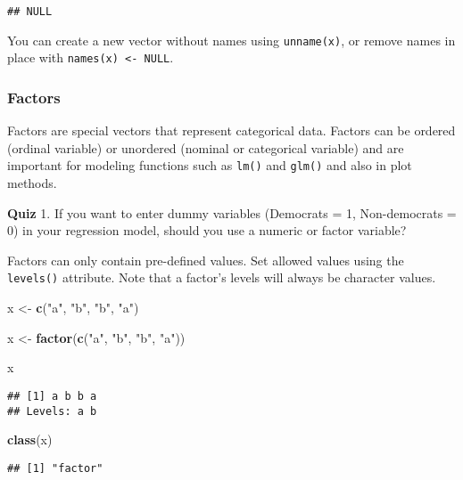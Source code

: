 \documentclass[
]{book}
\newenvironment{Shaded}{\begin{snugshade}}{\end{snugshade}}
\newcommand{\KeywordTok}[1]{\textcolor[rgb]{0.13,0.29,0.53}{\textbf{#1}}}
\newcommand{\NormalTok}[1]{#1}
\newcommand{\StringTok}[1]{\textcolor[rgb]{0.31,0.60,0.02}{#1}}
\begin{document}
\begin{verbatim}
## NULL
\end{verbatim}

You can create a new vector without names using \texttt{unname(x)}, or remove names in place with \texttt{names(x)\ \textless{}-\ NULL}.

\hypertarget{factors}{%
\subsubsection{Factors}\label{factors}}

Factors are special vectors that represent categorical data. Factors can be ordered (ordinal variable) or unordered (nominal or categorical variable) and are important for modeling functions such as \texttt{lm()} and \texttt{glm()} and also in plot methods.

\textbf{Quiz}
1. If you want to enter dummy variables (Democrats = 1, Non-democrats = 0) in your regression model, should you use a numeric or factor variable?

Factors can only contain pre-defined values. Set allowed values using the \texttt{levels()} attribute. Note that a factor's levels will always be character values.

\begin{Shaded}
\begin{Highlighting}[]
\NormalTok{x \textless{}{-}}\StringTok{ }\KeywordTok{c}\NormalTok{(}\StringTok{"a"}\NormalTok{, }\StringTok{"b"}\NormalTok{, }\StringTok{"b"}\NormalTok{, }\StringTok{"a"}\NormalTok{)}

\NormalTok{x \textless{}{-}}\StringTok{ }\KeywordTok{factor}\NormalTok{(}\KeywordTok{c}\NormalTok{(}\StringTok{"a"}\NormalTok{, }\StringTok{"b"}\NormalTok{, }\StringTok{"b"}\NormalTok{, }\StringTok{"a"}\NormalTok{))}

\NormalTok{x}
\end{Highlighting}
\end{Shaded}

\begin{verbatim}
## [1] a b b a
## Levels: a b
\end{verbatim}

\begin{Shaded}
\begin{Highlighting}[]
\KeywordTok{class}\NormalTok{(x)}
\end{Highlighting}
\end{Shaded}

\begin{verbatim}
## [1] "factor"
\end{verbatim}
\end{document}
